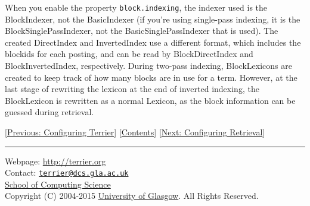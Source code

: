 When you enable the property \texttt{block.indexing}, the indexer used
is the BlockIndexer, not the BasicIndexer (if you're using single-pass
indexing, it is the BlockSinglePassIndexer, not the
BasicSinglePassIndexer that is used). The created DirectIndex and
InvertedIndex use a different format, which includes the blockids for
each posting, and can be read by BlockDirectIndex and
BlockInvertedIndex, respectively. During two-pass indexing,
BlockLexicons are created to keep track of how many blocks are in use
for a term. However, at the last stage of rewriting the lexicon at the
end of inverted indexing, the BlockLexicon is rewritten as a normal
Lexicon, as the block information can be guessed during retrieval.

{[}\href{configure_general.html}{Previous: Configuring Terrier}{]}
{[}\href{index.html}{Contents}{]}
{[}\href{configure_retrieval.html}{Next: Configuring Retrieval}{]}

\begin{center}\rule{0.5\linewidth}{\linethickness}\end{center}

Webpage: \url{http://terrier.org}\\
Contact:
\href{mailto:terrier@dcs.gla.ac.uk}{\nolinkurl{terrier@dcs.gla.ac.uk}}\\
\href{http://www.dcs.gla.ac.uk/}{School of Computing Science}\\
Copyright (C) 2004-2015 \href{http://www.gla.ac.uk/}{University of
Glasgow}. All Rights Reserved.
